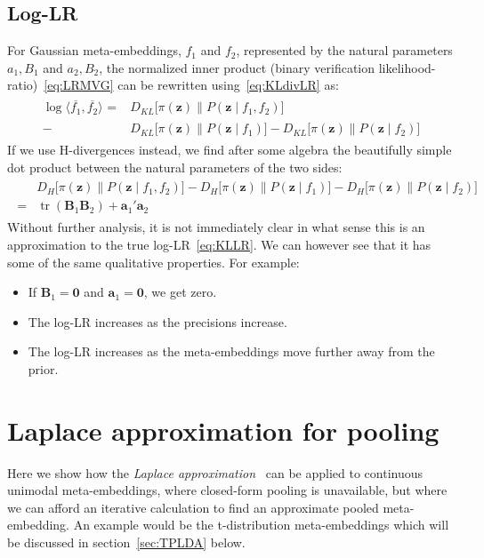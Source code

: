 \documentclass[a4paper,oneside,12pt,english]{report}
\def\zvec{\mathbf{z}}
\DeclareMathOperator{\trace}{tr}
\def\expv#1#2{\bigl\langle#1\bigr\rangle_{#2}}
\def\KL#1#2{D_{KL}\bigl[#1\|#2\bigr]}
\def\Hdiv#1#2{D_H\bigl[#1\|#2\bigr]}
\def\Bmat{\mathbf{B}}
\def\avec{\mathbf{a}}
\def\nulvec{\boldsymbol{0}}
\def\dot#1#2{\expv{#1,#2}{}}
\def\normal#1{\overline{#1}}
\def\dotn#1#2{\dot{\normal{#1}}{\normal{#2}}}
\begin{document}
\subsection{Log-LR}
For Gaussian meta-embeddings, $f_1$ and $f_2$, represented by the natural parameters $a_1,B_1$ and $a_2,B_2$, the normalized inner product (binary verification likelihood-ratio)~\eqref{eq:LRMVG} can be rewritten using~\eqref{eq:KLdivLR} as:
\begin{align}
\label{eq:KLLR}
\begin{split}
\log\dotn{f_1}{f_2} = &\KL{\pi(\zvec)}{P(\zvec\mid f_1,f_2)}\\
-&\KL{\pi(\zvec)}{P(\zvec\mid f_1)}-\KL{\pi(\zvec)}{P(\zvec\mid f_2)}
\end{split}
\end{align}
If we use H-divergences instead, we find after some algebra the beautifully simple dot product between the natural parameters of the two sides:
\begin{align}
\begin{split}
&\Hdiv{\pi(\zvec)}{P(\zvec\mid f_1,f_2)}
-\Hdiv{\pi(\zvec)}{P(\zvec\mid f_1)}-\Hdiv{\pi(\zvec)}{P(\zvec\mid f_2)} \\
=& \trace(\Bmat_1\Bmat_2) + \avec_1'\avec_2 
\end{split}
\end{align} 
Without further analysis, it is not immediately clear in what sense this is an approximation to the true log-LR~\eqref{eq:KLLR}. We can however see that it has some of the same qualitative properties. For example:
\begin{itemize}
	\item If $\Bmat_1=\nulvec$ and $\avec_1=\nulvec$, we get zero.
	\item The log-LR increases as the precisions increase.
	\item The log-LR increases as the meta-embeddings move further away from the prior.
\end{itemize}



\section{Laplace approximation for pooling}
\label{sec:Laplace}
Here we show how the \emph{Laplace approximation}~\cite{ITILA,PRML} can be applied to continuous unimodal meta-embeddings, where closed-form pooling is unavailable, but where we can afford an iterative calculation to find an approximate pooled meta-embedding. An example would be the t-distribution meta-embeddings which will be discussed in section~\ref{sec:TPLDA} below. 
\end{document}
